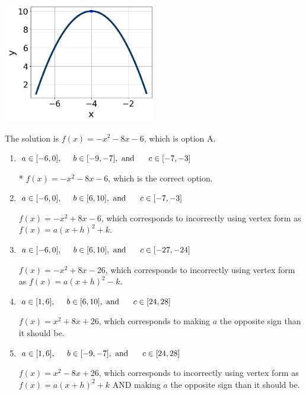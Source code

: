 \documentclass{extbook}[14pt]
\begin{document}
\begin{enumerate}
{\begin{center}
    \includegraphics[width=0.5\textwidth]{../Figures/quadraticGraphToEquationC.png}
\end{center}


The solution is \( f(x) = -x^{2} -8 x -6 \), which is option A.\begin{enumerate}[label=\Alph*.]
\item \( a \in [-6, 0], \hspace*{5mm} b \in [-9, -7], \text{ and } \hspace*{5mm} c \in [-7, -3] \)

* $f(x)=-x^{2} -8 x -6$, which is the correct option.
\item \( a \in [-6, 0], \hspace*{5mm} b \in [6, 10], \text{ and } \hspace*{5mm} c \in [-7, -3] \)

$f(x)=-x^{2} +8 x -6$, which corresponds to incorrectly using vertex form as $f(x) = a(x+h)^2+k$.
\item \( a \in [-6, 0], \hspace*{5mm} b \in [6, 10], \text{ and } \hspace*{5mm} c \in [-27, -24] \)

$f(x)=-x^{2} +8 x -26$, which corresponds to incorrectly using vertex form as $f(x) = a(x+h)^2 - k$.
\item \( a \in [1, 6], \hspace*{5mm} b \in [6, 10], \text{ and } \hspace*{5mm} c \in [24, 28] \)

$f(x)=x^{2} +8 x + 26$, which corresponds to making $a$ the opposite sign than it should be.
\item \( a \in [1, 6], \hspace*{5mm} b \in [-9, -7], \text{ and } \hspace*{5mm} c \in [24, 28] \)

$f(x)=x^{2} -8 x + 26$, which corresponds to incorrectly using vertex form as $f(x) = a(x+h)^2+k$ AND making $a$ the opposite sign than it should be.
\end{enumerate}

}
\end{enumerate}
\end{document}
